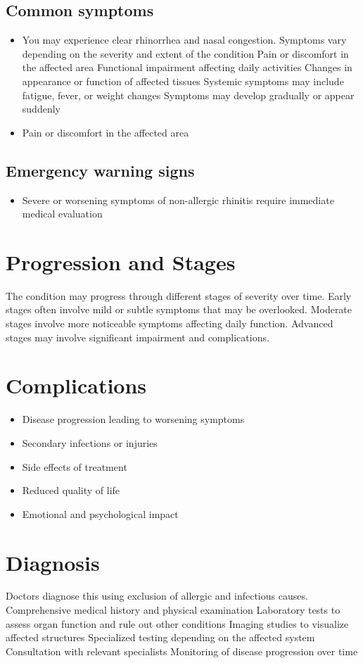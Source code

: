 \subsection{Common symptoms}
\begin{itemize}[noitemsep]
  \item You may experience clear rhinorrhea and nasal congestion. Symptoms vary depending on the severity and extent of the condition Pain or discomfort in the affected area Functional impairment affecting daily activities Changes in appearance or function of affected tissues Systemic symptoms may include fatigue, fever, or weight changes Symptoms may develop gradually or appear suddenly
  \item Pain or discomfort in the affected area
  \end{itemize}

\subsection{Emergency warning signs}
\begin{itemize}[noitemsep]
  \item Severe or worsening symptoms of non-allergic rhinitis require immediate medical evaluation
\end{itemize}
\section{Progression and Stages}
The condition may progress through different stages of severity over time. Early stages often involve mild or subtle symptoms that may be overlooked. Moderate stages involve more noticeable symptoms affecting daily function. Advanced stages may involve significant impairment and complications.
\section{Complications}
\begin{itemize}[noitemsep]
  \item Disease progression leading to worsening symptoms
  \item Secondary infections or injuries
  \item Side effects of treatment
  \item Reduced quality of life
  \item Emotional and psychological impact
\end{itemize}
\section{Diagnosis}
Doctors diagnose this using exclusion of allergic and infectious causes. Comprehensive medical history and physical examination Laboratory tests to assess organ function and rule out other conditions Imaging studies to visualize affected structures Specialized testing depending on the affected system Consultation with relevant specialists Monitoring of disease progression over time

